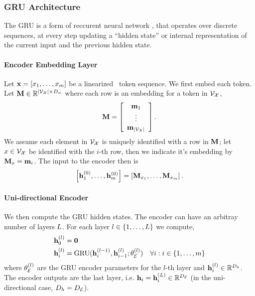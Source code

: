 \subsubsection{GRU Architecture}
The GRU is a form of reccurent neural network \cite{elman}, that operates over discrete 
sequences, at every step updating a ``hidden state'' or internal representation of the current
input and the previous hidden state. 

\paragraph{Encoder Embedding Layer}
Let $\mathbf{x} = \left[ x_1,\ldots,x_{m}\right]$ be a linearized 
\meaningrepresentation~token sequence. We first embed each token. Let $\mathbf{M} \in \mathbb{R}^{{\left\vert \mathcal{V}_{\mathcal{X}} \right\vert} \times D_{w}}$ where each row is an embedding for a token in $\mathcal{V}_{\mathcal{X}}$,
\[ \mathbf{M} = \left[ \begin{array}{c} \mathbf{m}_1\\ \vdots \\ \mathbf{m}_{\left\vert \mathcal{V}_{\mathcal{X}} \right\vert} \end{array}\right]. \]
We assume each element in $\mathcal{V}_{\mathcal{X}}$ is uniquely identified with a row in $\mathbf{M}$; let $x\in\mathcal{V}_{\mathcal{X}}$ be identified with the $i$-th row, then we indicate it's embedding by $\mathbf{M}_{x} = \mathbf{m}_i$.  The input to the encoder then is 
\[\left[\mathbf{h}^{(0)}_1,\ldots,\mathbf{h}^{(0)}_{m}\right] = \left[\mathbf{M}_{x_1},\ldots,
                                                                            \mathbf{M}_{x_{m}}\right]. \]


\paragraph{Uni-directional Encoder}
We then compute the GRU hidden states. The encoder can have an arbitray number of layers $L$.
For each layer $l \in \{1,\ldots, L\}$ we compute,
\begin{align*}
    \mathbf{h}_0^{(l)} & = \mathbf{0} \\
    \mathbf{h}_i^{(l)} & =\operatorname{GRU}(\mathbf{h}_i^{(l - 1)}, \mathbf{h}_{i-1}^{(l)}; \theta_\mathcal{E}^{(l)}) & \forall i : i \in \{1,\ldots, m\}
\end{align*}
where $\theta_\mathcal{E}^{(l)}$ are the GRU encoder parameters for the $l$-th layer and $\mathbf{h}^{(l)}_i \in \mathbb{R}^{D_{h}}$. The encoder outputs are the last layer, i.e. $\mathbf{h}_i = \mathbf{h}_i^{(L)} \in \mathbb{R}^{{D_\mathcal{E}}}$ (in the uni-directional case, $D_{h} = {D_\mathcal{E}}$).

